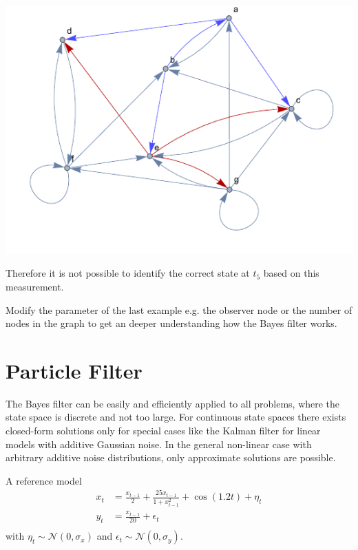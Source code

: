 \documentclass{tstextbook}
\begin{document}
\begin{example}
\includegraphics[scale=0.8, center]{images/highlighted_graph_world.pdf}

Therefore it is not possible to identify the correct state at $t_5$ based on this measurement.   

\end{example}

\begin{exercise}
Modify the parameter of the last example e.g. the observer node or the number of nodes in the graph to get an deeper understanding how the Bayes filter works.
\end{exercise}

\section{Particle Filter}
\label{se:particle_filter}

The Bayes filter can be easily and efficiently applied to all problems, where the state space is discrete and not too large. For continuous state spaces there exists closed-form solutions only for special cases like the Kalman filter for linear models with additive Gaussian noise. In the general non-linear case with arbitrary additive noise distributions, only approximate solutions are possible.

\begin{example}
A reference model \cite{klaas2012} 
\begin{equation}
\begin{aligned}
x_t&=\frac{x_{t-1}}{2}+\frac{25 x_{t-1}}{1+x_{t-1}^2}+\cos(1.2 t)+\eta_t\\
y_t&=\frac{x_{t-1}}{20}+\epsilon_t \\
\end{aligned}
\end{equation}
with $\eta_t\sim \mathcal{N}(0,\sigma_x)$ and $\epsilon_t
\sim \mathcal{N}(0,\sigma_y)$.
\end{example} 
\end{document}
